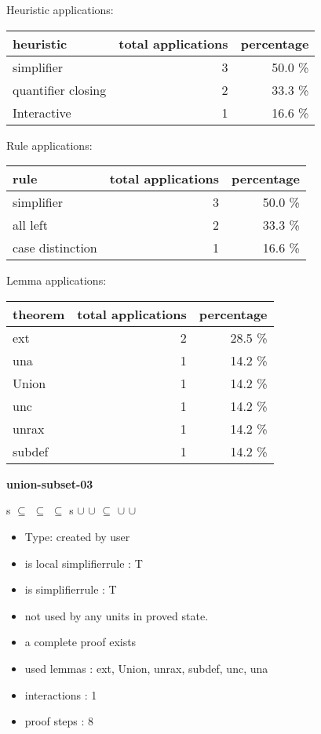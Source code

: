 \documentclass[a4paper]{article}
\begin{document}
\medskip


Heuristic applications:

\begin{supertabular}{l|r|r}
heuristic	& total applications & percentage \\ \hline
simplifier & 3 & 50.0 \% \\
quantifier closing & 2 & 33.3 \% \\
Interactive & 1 & 16.6 \% \\

\end{supertabular}

Rule applications:

\begin{supertabular}{l|r|r}
rule	        & total applications & percentage \\ \hline
simplifier & 3 & 50.0 \% \\
all left & 2 & 33.3 \% \\
case distinction & 1 & 16.6 \% \\

\end{supertabular}

Lemma applications:

\begin{supertabular}{l|r|r}
theorem	        & total applications & percentage \\ \hline
ext & 2 & 28.5 \% \\
una & 1 & 14.2 \% \\
Union & 1 & 14.2 \% \\
unc & 1 & 14.2 \% \\
unrax & 1 & 14.2 \% \\
subdef & 1 & 14.2 \% \\

\end{supertabular}
\pagebreak

{\LARGE\bf union-subset-03}\label{lemma-union-subset-03}

\medskip

 \Fol s $\subseteq$  \And {} $\subseteq$  \And {} $\subseteq$  \Imp s $\cup$  $\cup$  $\subseteq$  $\cup$  $\cup$ 

\begin{itemize}

\item Type: created by user

\item is local simplifierrule : T
\item is simplifierrule : T
\item not used by any units in proved state.
\item       a complete proof exists
\item       used lemmas  : ext, Union, unrax, subdef, unc, una
\item       interactions : 1
\item       proof steps  : 8
\end{itemize}
\end{document}
